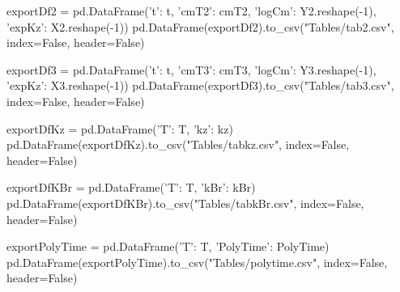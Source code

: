 \begin{pycode}
exportDf2 = pd.DataFrame({'t': t, 'cmT2': cmT2, 'logCm': Y2.reshape(-1), 'expKz': X2.reshape(-1)})
pd.DataFrame(exportDf2).to_csv("Tables/tab2.csv", index=False, header=False)

exportDf3 = pd.DataFrame({'t': t, 'cmT3': cmT3, 'logCm': Y3.reshape(-1), 'expKz': X3.reshape(-1)})
pd.DataFrame(exportDf3).to_csv("Tables/tab3.csv", index=False, header=False)

exportDfKz = pd.DataFrame({'T': T, 'kz': kz})
pd.DataFrame(exportDfKz).to_csv("Tables/tabkz.csv", index=False, header=False)

exportDfKBr = pd.DataFrame({'T': T, 'kBr': kBr})
pd.DataFrame(exportDfKBr).to_csv("Tables/tabkBr.csv", index=False, header=False)

exportPolyTime = pd.DataFrame({'T': T, 'PolyTime': PolyTime})
pd.DataFrame(exportPolyTime).to_csv("Tables/polytime.csv", index=False, header=False)
\end{pycode}

